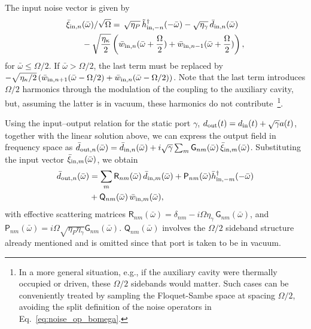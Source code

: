 \documentclass[prl,twocolumn,floatfix,10pt,superscriptaddress]{revtex4-2}
\newcommand{\msf}[1]{\mathsf{#1}}
\newcommand{\bomega}{{\bar{\omega}}}
\newcommand{\rmout}{{{\rm out}}}
\newcommand{\rmin}{{{\rm in}}}
\begin{document}

The input noise vector is given by
\begin{align}\label{eq:noise_op_bomega}
\begin{aligned}
\bar{\xi}_{\rmin,n}&(\bomega)/\sqrt{\Omega}
= \,\sqrt{\eta_P}\, \tilde{h}^\dagger_{\rmin,-n}(-\bomega)- 
\sqrt{\eta_{\gamma}}\, \bar{d}_{\rmin,n}(\bomega)\\
&- \sqrt{\frac{\eta_\kappa}{2}} \left( \bar{w}_{\rmin,n}(\bomega + \frac{\Omega}{2}) + \bar{w}_{\rmin,n-1}(\bomega + \frac{\Omega}{2}) \right),
\end{aligned} 
\end{align}
for $\bomega \leq \Omega/2$. If 
$\bomega > \Omega/2$, the last term must be replaced by $-\sqrt{\eta_\kappa/2}
\left( \bar{w}_{\rmin,n+1}(\bomega - \Omega/2) + \bar{w}_{\rmin,n}(\bomega - \Omega/2) \right)$. Note that the last term introduces $\Omega/2$ harmonics through the modulation of the coupling to the auxiliary cavity, but, assuming the latter is in vacuum, these harmonics do not contribute~\footnote{In a more general situation, e.g., if the auxiliary cavity were thermally occupied or driven, these $\Omega/2$ sidebands would matter. Such cases can be conveniently treated by sampling the Floquet-Sambe space at spacing $\Omega/2$, avoiding the split definition of the noise operators in Eq.~\eqref{eq:noise_op_bomega}.}. 

Using the input–output relation for the static port $\gamma$, $d_{\rmout}(t)=d_{\rmin}(t)+\sqrt{\gamma} a(t)$, together with the linear solution above, we can express the output field in frequency space as
$\bar{d}_{\rmout,n}(\bomega) 
= \bar{d}_{\rmin,n}(\bomega) 
+ i \sqrt{\gamma} \sum_m \msf{G}_{n m}(\bomega)\, \bar{\xi}_{\rmin,m}(\bomega)$. Substituting the input vector $\bar{\xi}_{\rmin,m}(\bomega)$, we obtain
\begin{align}
\bar{d}_{\rmout,n}(\bomega) 
&= \sum_m \msf{R}_{n m}(\bomega)\, \bar{d}_{\rmin,m}(\bomega)
+\msf{P}_{nm}(\bomega) \bar{h}_{\rmin,-m}^\dag(-\bomega)\nonumber\\
&+ \msf{Q}_{n m}(\bomega)\, \bar{w}_{\rmin,m}(\bomega),\label{eq:bar_dn_out}
\end{align}
with effective scattering matrices
$\msf{R}_{n m}(\bomega) = \delta_{n m} - i \Omega\eta_{\gamma}\, \msf{G}_{n m}(\bomega)$, and $\msf{P}_{n m}(\bomega)=i\Omega\sqrt{\eta_{P}\eta_{\gamma}}\msf{G}_{nm}(\bomega)$. $\msf{Q}_{n m}(\bomega)$ involves the $\Omega/2$ sideband structure already mentioned and is omitted since that port is taken to be in vacuum.
\end{document}
